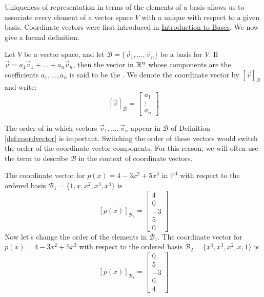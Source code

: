\documentclass{ximera}
\begin{document}
Uniqueness of representation in terms of the elements of a basis allows us to associate every element of a vector space $V$ with a unique  with respect to a given basis.  Coordinate vectors were first introduced in \href{https://ximera.osu.edu/oerlinalg/LinearAlgebra/VSP-0030/main}{Introduction to Bases}.  We now give a formal definition.

\begin{definition}\label{def:coordvector}
Let $V$ be a vector space, and let $\mathcal{B}=\{\vec{v}_1, \ldots ,\vec{v}_n\}$ be a basis for $V$.  If $\vec{v}=a_1\vec{v}_1+\ldots +a_n\vec{v}_n$, then the vector in $\mathbb{R}^n$ whose components are the coefficients $a_1, \ldots ,a_n$  is said to be the .  We denote the coordinate vector by $[\vec{v}]_{\mathcal{B}}$ and write:
$$[\vec{v}]_{\mathcal{B}}=\begin{bmatrix}a_1\\\vdots \\a_n\end{bmatrix}$$
\end{definition}

\begin{remark}\label{rem:coordVectOrder}
The order of in which vectors $\vec{v}_1, \ldots ,\vec{v}_n$ appear in $\mathcal{B}$ of Definition \ref{def:coordvector} is important.  Switching the order of these vectors would switch the order of the coordinate vector components.  For this reason, we will often use the term  to describe $\mathcal{B}$ in the context of coordinate vectors.
\end{remark}

\begin{example}\label{ex:coordvectorinpolyvectspace}
The coordinate vector for $p(x)=4-3x^2+5x^3$ in $\mathbb{P}^4$ with respect to the ordered basis $\mathcal{B}_1=\{1, x, x^2, x^3, x^4\}$ is 
$$[p(x)]_{\mathcal{B}_1}=\begin{bmatrix}4\\0\\-3\\5\\0\end{bmatrix}$$
Now let's change the order of the elements in $\mathcal{B}_1$.  The coordinate vector for $p(x)=4-3x^2+5x^3$ with respect to the ordered basis $\mathcal{B}_2=\{x^4, x^3, x^2, x, 1\}$ is 
$$[p(x)]_{\mathcal{B}_2}=\begin{bmatrix}0\\5\\-3\\0\\4\end{bmatrix}$$
\end{example}
\end{document}
